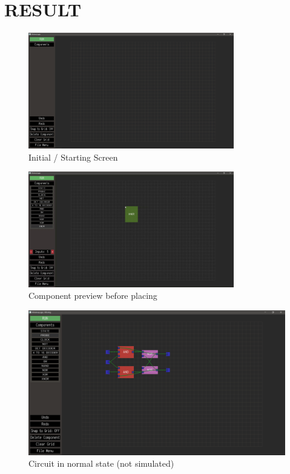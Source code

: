 \documentclass[report]{subfiles}
\begin{document}
\chapter{RESULT}
\begin{figure}[H]
    \centering
    \includegraphics[width=0.8\textwidth]{graphics/initial_screen.png}
    \caption{Initial / Starting Screen}
\end{figure}
\begin{figure}[H]
    \centering
    \includegraphics[width=0.8\textwidth]{graphics/preview.png}
    \caption{Component preview before placing}
\end{figure}
\begin{figure}[H]
    \centering
    \includegraphics[width=\textwidth]{graphics/jkff_normal.png}
    \caption{Circuit in normal state (not simulated)}
\end{figure}
\end{document}
